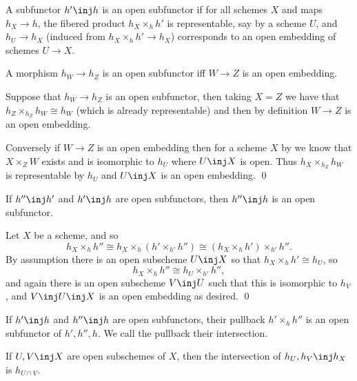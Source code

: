 \eproof

\bdefn

    A subfunctor $h'\inj h$ is an {\emphcolor open subfunctor} if for all schemes $X$ and maps
    $h_X\to h$, the fibered product $h_X\times_hh'$ is representable, say by a scheme $U$, and
    $h_U\to h_X$ (induced from $h_X\times_hh'\to h_X$) corresponds to an open embedding of schemes
    $U\to X$.

\edefn

\blemm

    A morphism $h_W\to h_Z$ is an open subfunctor iff $W\to Z$ is an open embedding.

\elemm

\bproof

    Suppose that $h_W\to h_Z$ is an open subfunctor, then taking $X=Z$ we have that
    $h_Z\times_{h_Z}h_W\cong h_W$ (which is already representable) and then by definition $W\to Z$ is an
    open embedding.

    Conversely if $W\to Z$ is an open embedding then for a scheme $X$ by 
    we know that $X\times_ZW$ exists and is isomorphic to $h_U$ where $U\inj X$ is open.
    Thus $h_X\times_{h_Z}h_W$ is representable by $h_U$ and $U\inj X$ is an open embedding.
    \qed

\eproof

\blemm

    If $h''\inj h'$ and $h'\inj h$ are open subfunctors, then $h''\inj h$ is an open subfunctor.

\elemm

\bproof

    Let $X$ be a scheme, and so
    $$ h_X\times_hh'' \cong h_X\times_h(h'\times_{h'}h'') \cong (h_X\times_hh')\times_{h'}h'' . $$
    By assumption there is an open subscheme $U\inj X$ so that $h_X\times_hh'\cong h_U$, so
    $$ h_X\times_hh'' \cong h_U\times_{h'}h'' , $$
    and again there is an open subscheme $V\inj U$ such that this is isomorphic to $h_V$, and
    $V\inj U\inj X$ is an open embedding as desired.
    \qed

\eproof

\blemm

    \benum
        \item If $h'\inj h$ and $h''\inj h$ are open subfunctors, their pullback $h'\times_hh''$
        is an open subfunctor of $h',h'',h$.
        We call the pullback their {\emphcolor intersection}.
        \item If $U,V\inj X$ are open subschemes of $X$, then the intersection of $h_U,h_V\inj h_X$
        is $h_{U\cap V}$.
    \eenum

